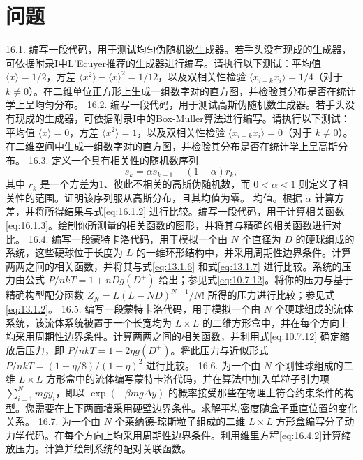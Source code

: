 \section{问题}\label{ux95eeux9898_chap16}
16.1. 编写一段代码，用于测试均匀伪随机数生成器。若手头没有现成的生成器，可依据附录I中L'Ecuyer推荐的生成器进行编写。请执行以下测试：平均值 \(\langle x \rangle = 1/2\)，方差 \(\langle x^2 \rangle - \langle x \rangle^2 = 1/12\)，以及双相关性检验 \(\langle x_{i+k}x_i \rangle = 1/4\)（对于 \(k \neq 0\)）。在二维单位正方形上生成一组数字对的直方图，并检验其分布是否在统计学上呈均匀分布。
16.2. 编写一段代码，用于测试高斯伪随机数生成器。若手头没有现成的生成器，可依据附录I中的Box-Muller算法进行编写。请执行以下测试：平均值 \(\langle x \rangle = 0\)，方差 \(\langle x^2 \rangle = 1\)，以及双相关性检验 \(\langle x_{i+k}x_i \rangle = 0\)（对于 \(k \neq 0\)）。在二维空间中生成一组数字对的直方图，并检验其分布是否在统计学上呈高斯分布。
16.3. 定义一个具有相关性的随机数序列
\begin{equation}\tag{16.5.1}\label{eq:16.5.1}
s _ { k } = \alpha s _ { k - 1 } + ( 1 - \alpha ) r _ { k } ,
\end{equation}
其中 \(r_{k}\) 是一个方差为1、彼此不相关的高斯伪随机数，而 \(0 < \alpha < 1\) 则定义了相关性的范围。证明该序列服从高斯分布，且其均值为零。
均值。根据 \(\alpha\) 计算方差，并将所得结果与式\autoref{eq:16.1.2} 进行比较。编写一段代码，用于计算相关函数\autoref{eq:16.1.3}。绘制你所测量的相关函数的图形，并将其与精确的相关函数进行对比。
16.4. 编写一段蒙特卡洛代码，用于模拟一个由 \(N\) 个直径为 \(D\) 的硬球组成的系统，这些硬球位于长度为 \(L\) 的一维环形结构中，并采用周期性边界条件。计算两两之间的相关函数，并将其与式\autoref{eq:13.1.6} 和式\autoref{eq:13.1.7} 进行比较。系统的压力由公式 \(P/nkT = 1 + nDg(D^+)\) 给出；参见式\autoref{eq:10.7.12}。将你的压力与基于精确构型配分函数 \(Z_N = L(L - ND)^{N-1}/N!\) 所得的压力进行比较；参见式\autoref{eq:13.1.2}。
16.5. 编写一段蒙特卡洛代码，用于模拟一个由 \(N\) 个硬球组成的流体系统，该流体系统被置于一个长宽均为 \(L \times L\) 的二维方形盒中，并在每个方向上均采用周期性边界条件。计算两两之间的相关函数，并利用式\autoref{eq:10.7.12} 确定缩放后压力，即 \(P/nkT = 1 + 2\eta g(D^{+})\)。将此压力与近似形式 \(P/nkT = (1 + \eta/8)/(1 - \eta)^{2}\) 进行比较。
16.6. 为一个由 \(N\) 个刚性球组成的二维 \(L \times L\) 方形盒中的流体编写蒙特卡洛代码，并在算法中加入单粒子引力项 \(\sum_{i=1}^{N} mgy_{i}\)，即以 \(\exp(-\beta m g \Delta y)\) 的概率接受那些在物理上符合约束条件的构型。您需要在上下两面墙采用硬壁边界条件。求解平均密度随盒子垂直位置的变化关系。
16.7. 为一个由 \(N\) 个莱纳德-琼斯粒子组成的二维 \(L \times L\) 方形盒编写分子动力学代码。在每个方向上均采用周期性边界条件。利用维里方程\autoref{eq:16.4.2}计算缩放压力。计算并绘制系统的配对关联函数。
